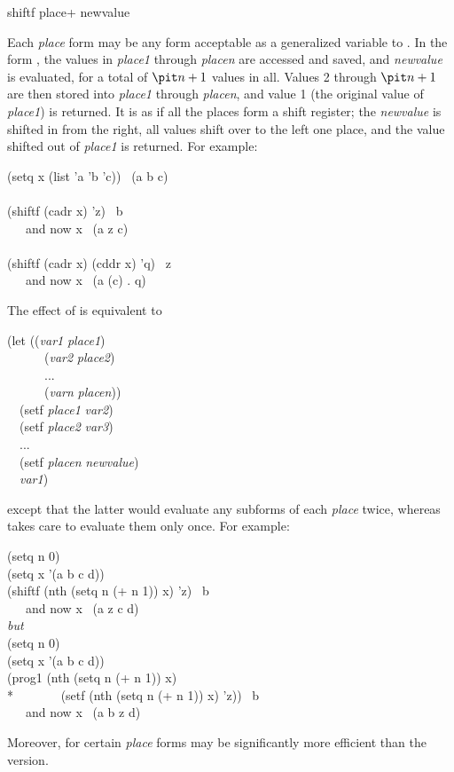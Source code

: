 \begin{defmac}
shiftf {place}+ newvalue

Each {\it place} form may be any form acceptable
as a generalized variable to .
In the form ,
the values in {\it place1} through {\it placen} are accessed and saved,
and {\it newvalue} is evaluated, for a total of ${\it n}+1$ values in all.
Values 2 through ${\it n}+1$ are then stored into {\it place1} through {\it placen},
and value 1 (the original value of {\it place1}) is returned.
It is as if all the places form a shift register; the {\it newvalue}
is shifted in from the right, all values shift over to the left one place,
and the value shifted out of {\it place1} is returned.  For example:
\begin{lisp}
(setq x (list 'a 'b 'c)) \EV\ (a b c) \\
 \\
(shiftf (cadr x) 'z) \EV\ b \\
~~~{\rm and now} x \EV\ (a z c) \\
 \\
(shiftf (cadr x) (cddr x) 'q) \EV\ z \\
~~~{\rm and now} x \EV\ (a (c) . q)
\end{lisp}
The effect of 
is equivalent to
\begin{lisp}
(let (({\it var1} {\it place1}) \\
~~~~~~({\it var2} {\it place2}) \\
~~~~~~... \\
~~~~~~({\it varn} {\it placen})) \\
~~(setf {\it place1} {\it var2}) \\
~~(setf {\it place2} {\it var3}) \\
~~... \\
~~(setf {\it placen} {\it newvalue}) \\
~~{\it var1})
\end{lisp}
except that the latter would evaluate any subforms of each {\it place} twice,
whereas  takes care to evaluate them only once.
For example:
\begin{lisp}
(setq n 0) \\
(setq x '(a b c d)) \\
(shiftf (nth (setq n (+ n 1)) x) 'z) \EV\ b \\
~~~{\rm and now} x \EV\ (a z c d) \\[4pt]
{\it but} \\[4pt]
(setq n 0) \\
(setq x '(a b c d)) \\
(prog1 (nth (setq n (+ n 1)) x) \\*
~~~~~~~(setf (nth (setq n (+ n 1)) x) 'z)) \EV\ b \\
~~~{\rm and now} x \EV\ (a b z d)
\end{lisp}
Moreover, for certain {\it place} forms  may be
significantly more efficient than the  version.


\end{defmac}
